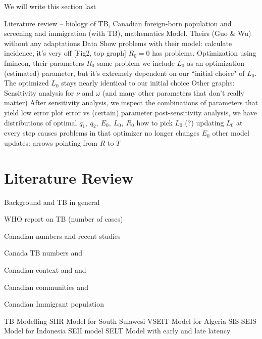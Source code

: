 \documentclass[sn-mathphys,Numbered]{sn-jnl}%
\theoremstyle{thmstyleone}%
\theoremstyle{thmstyletwo}%
\theoremstyle{thmstylethree}%
\begin{document}
We will write this section last

\begin{outline}
    \1 Literature review -- biology of TB, Canadian foreign-born population and screening and immigration (with TB), mathematics 
    \1 Model. Theirs (Guo \& Wu) without any adaptations
        \2 Data
    \1 Show problems with their model: 
        \2 calculate incidence, it's very off [Fig2, top graph]
        \2 $R_0=0$ has problems.
    \1 Optimization using fmincon, their parameters
        \2 $R_0$ same problem
        \2 we include $L_0$ as an optimization (estimated) parameter, but it's extremely dependent on our ``initial choice" of $L_0$.  The optimized $L_0$ stays nearly identical to our initial choice
    \1 Other graphs:
        \2 Sensitivity analysis for $\nu$ and $\omega$ (and many other parameters that don't really matter)
        \2 After sensitivity analysis, we inspect the combinations of parameters that yield low error
        \2 plot error vs (certain) parameter
        \2 post-sensitivity analysis, we have distributions of optimal $q_1,~q_2,~E_0,~ L_0,~ R_0$
        \2 how to pick $L_0$
        \2 (?) updating $L_0$ at every step causes problems in that optimizer no longer changes $E_0$
    \1 other model updates:
        \2 arrows pointing from $R$ to $T$
\end{outline}

\section{Literature Review}\label{sec2}

Background and TB in general

WHO report on TB (number of cases) \cite{WHO2022Global2022}

Canadian numbers and recent studies

Canada TB numbers \cite{MounchiliA.2022TuberculosisReport} and \cite{Long2020TuberculosisCanada}

Canadian context \cite{Ronald2018DemographicStudy} and \cite{CollegeofFamilyPhysiciansofCanada.2017TuberculosisCanada} and \cite{Essue2018BetterCanada}

Canadian communities \cite{Tuite2017StochasticCommunities} and \cite{Amiri2021SpatialCanada} \cite{Zwick2021RepresentingApproach}

Canadian Immigrant population \cite{Ng2018HealthCanada}

TB Modelling
SIIR Model for South Sulawesi \cite{Side2023TheSulawesi}
VSEIT Model for Algeria \cite{Chennaf2023AnalysisEffects}
SIS-SEIS Model for Indonesia \cite{Maulana2022ParameterIndonesia}
SEII model \cite{Permatasari2022MATHEMATICALINFECTION}
SELT Model with early and late latency \cite{Guo2006GlobalTuberculosis}
\end{document}
